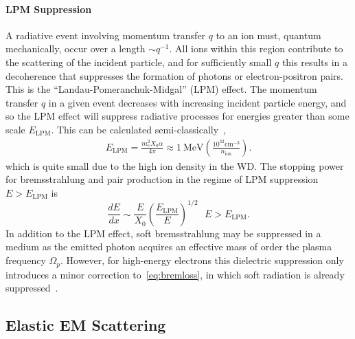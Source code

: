 \documentclass[preprintnumbers,amsmath,amssymb,prd,superscriptaddress]{revtex4}
\newcommand{\MeV}{\text{MeV}}
\newcommand{\cm}{\text{cm}}
\newcommand{\ion}{\text{ion}}
\newcommand{\LPM}{\text{LPM}}
\def\r{\right)}
\def\l{\left(}
\begin{document}
\begin{appendices}
\paragraph{LPM Suppression}
A radiative event involving momentum transfer $q$ to an ion must, quantum mechanically, occur over a length $\sim q^{-1}$.
All ions within this region contribute to the scattering of the incident particle, and for sufficiently small $q$ this results in a decoherence that suppresses the formation of photons or electron-positron pairs.
This is the ``Landau-Pomeranchuk-Midgal'' (LPM) effect.
The momentum transfer $q$ in a given event decreases with increasing incident particle energy, and so the LPM effect will suppress radiative processes for energies greater than some scale $E_\LPM$.
This can be calculated semi-classically~\cite{Klein:1998du},
\begin{align}
  E_\LPM = \frac{m_e^2 X_0 \alpha}{4 \pi}
  \approx 1~\MeV \l \frac{10^{32} \cm^{-3}}{n_\ion} \r.
\label{eq:LPM}
\end{align}
which is quite small due to the high ion density in the WD.
The stopping power for bremsstrahlung and pair production in the regime of LPM suppression $E > E_\LPM$ is
\begin{equation}
\label{eq:bremloss}
\frac{dE}{dx} \sim  \frac{E}{X_0} \l\frac{E_\LPM}{E} \r^{1/2} ~~~ E>E_\LPM.
\end{equation}
In addition to the LPM effect, soft bremsstrahlung may be suppressed in a medium as the emitted photon acquires an effective mass of order the plasma frequency $\Omega_p$.
However, for high-energy electrons this dielectric suppression only introduces a minor correction to~\eqref{eq:bremloss}, in which soft radiation is already suppressed~\cite{Klein:1998du}.

\subsection{Elastic EM Scattering}
\label{sec:coulomb}


\end{appendices}
\end{document}
